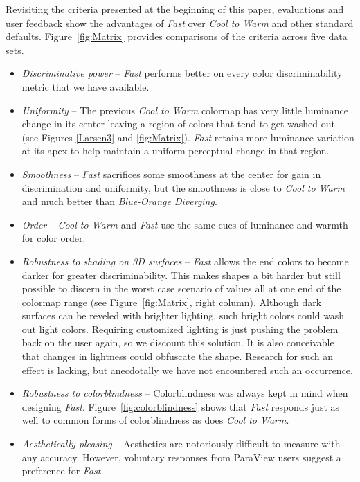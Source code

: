 \documentclass{IEEEcsmag}
\newcommand*{\colormap}[1]{\textsl{#1}\xspace}
\newcommand*{\coolwarm}{\colormap{Cool to Warm}}
\newcommand*{\blueorange}{\colormap{Blue-Orange Diverging}}
\newcommand*{\fast}{\colormap{Fast}}
\begin{document}
Revisiting the criteria presented at the beginning of this paper, evaluations and user feedback show the advantages of \fast over \coolwarm and other standard defaults. Figure~\ref{fig:Matrix} provides comparisons of the criteria across five data sets.




\begin{itemize}

\item \emph{Discriminative power} --
  \fast performs better on every color discriminability metric that we have available.
\item \emph{Uniformity} --
  The previous \coolwarm colormap has very little luminance change in its center leaving a region of colors that tend to get washed out (see Figures \ref{Larsen3} and \ref{fig:Matrix}).
  \fast retains more luminance variation at its apex to help maintain a uniform perceptual change in that region.
\item \emph{Smoothness} --
  \fast sacrifices some smoothness at the center for gain in discrimination and uniformity, but the smoothness is close to \coolwarm and much better than \blueorange.
\item \emph{Order} --
  \coolwarm and \fast use the same cues of luminance and warmth for color order.
\item \emph{Robustness to shading on 3D surfaces} --
  \fast allows the end colors to become darker for greater discriminability.
  This makes shapes a bit harder but still possible to discern in the worst case scenario of values all at one end of the colormap range (see Figure~\ref{fig:Matrix}, right column).
  Although dark surfaces can be reveled with brighter lighting, such bright colors could wash out light colors.
  Requiring customized lighting is just pushing the problem back on the user again, so we discount this solution.
  It is also conceivable that changes in lightness could obfuscate the shape.
  Research for such an effect is lacking, but anecdotally we have not encountered such an occurrence.
\item \emph{Robustness to colorblindness} --
  Colorblindness was always kept in mind when designing \fast.
  Figure~\ref{fig:colorblindness} shows that \fast responds just as well to common forms of colorblindness as does \coolwarm.
\item \emph{Aesthetically pleasing} --
  Aesthetics are notoriously difficult to measure with any accuracy.
  However, voluntary responses from ParaView users suggest a preference for \fast.

\end{itemize}
\end{document}
